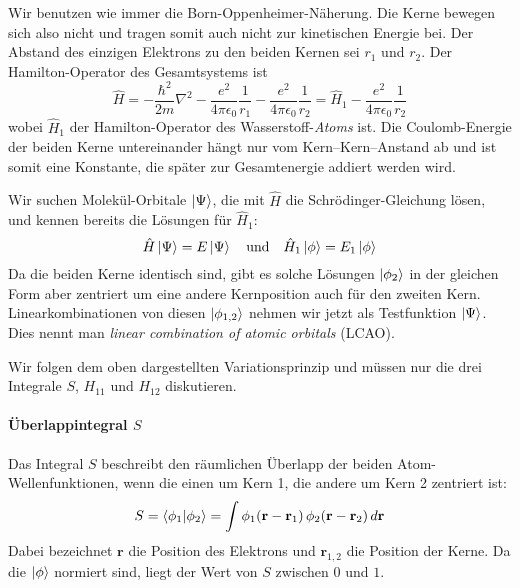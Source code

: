 Wir benutzen wie immer die Born-Oppenheimer-Näherung. Die Kerne bewegen sich also nicht und tragen somit auch nicht zur kinetischen Energie bei. Der Abstand des einzigen Elektrons zu den beiden Kernen sei $r_1$ und $r_2$. Der Hamilton-Operator des Gesamtsystems ist
\begin{equation}
\hat{H} =  - \frac{\hbar^2}{2 m} \nabla^2 - \frac{e^2}{4 \pi \epsilon_0} \frac{1}{r_{1}} - \frac{e^2}{4 \pi \epsilon_0} \frac{1}{r_{2}}
= \hat{H}_1  - \frac{e^2}{4 \pi \epsilon_0} \frac{1}{r_{2}}
\end{equation} 
wobei $\hat{H}_1 $ der Hamilton-Operator des Wasserstoff-\emph{Atoms} ist. Die Coulomb-Energie der beiden Kerne untereinander hängt nur vom Kern--Kern--Anstand ab und ist somit eine Konstante, die später zur Gesamtenergie addiert werden wird.

Wir suchen Molekül-Orbitale $\ket{\Psi}$, die mit $\hat{H}$ die Schrödinger-Gleichung lösen, und kennen bereits die Lösungen für $\hat{H}_1$:
\begin{equation}
\hat{H} \ket{\Psi} = E \ket{\Psi} \quad \text{und} \quad 
\hat{H}_1 \ket{\phi} = E_1 \ket{\phi} 
\end{equation}
Da die beiden Kerne identisch sind, gibt es solche Lösungen $\ket{\phi_2}$ in der gleichen Form aber zentriert um eine andere Kernposition auch für den zweiten Kern. Linearkombinationen von diesen  $\ket{\phi_{1,2}}$ nehmen wir jetzt als Testfunktion $\ket{\Psi}$. Dies nennt man \emph{linear combination of atomic orbitals} (LCAO).

Wir folgen dem oben dargestellten Variationsprinzip und müssen nur die drei Integrale $S$, $ H_{11}$ und $H_{12}$ diskutieren.

\paragraph{Überlappintegral $S$} Das Integral $S$ beschreibt den räumlichen Überlapp der beiden Atom-Wellenfunktionen, wenn die einen um Kern 1, die andere um Kern 2 zentriert ist:
\begin{equation}
 S = \braket{\phi_1 | \phi_2} = \int \phi_1( \mathbf{r} - \mathbf{r}_1)  \, \phi_2( \mathbf{r} - \mathbf{r}_2)   \, d\mathbf{r}
\end{equation}
Dabei bezeichnet $\mathbf{r}$ die Position des Elektrons und  $\mathbf{r}_{1,2}$  die Position der Kerne. Da die $\ket{\phi}$ normiert sind, liegt der Wert von $S$ zwischen $0$ und $1$.

